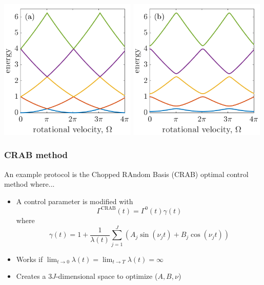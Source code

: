 \documentclass{beamer}
\begin{document}
\begin{frame}
\includegraphics[width = 0.49\textwidth]{../data/1d/cross.png}
\includegraphics[width = 0.49\textwidth]{../data/1d/nocross.png}
\end{frame}

\begin{frame}
\frametitle{CRAB method}

An example protocol is the Chopped RAndom Basis (CRAB) optimal control method where...

\begin{itemize}
\item A control parameter is modified with
$$
\Gamma^{\text{CRAB}}(t) = \Gamma^0(t)\gamma(t)
$$
where
$$
\gamma(t)=1+\frac{1}{\lambda(t)}\sum_{j=1}^J(A_j \sin(\nu_jt) + B_j\cos(\nu_jt))
$$
\item Works if $\lim_{t\rightarrow 0} \lambda(t) = \lim_{t\rightarrow T}\lambda(t) = \infty$
\item Creates a $3J$-dimensional space to optimize ($A, B, \nu$)
\end{itemize}

\end{frame}
\end{document}
